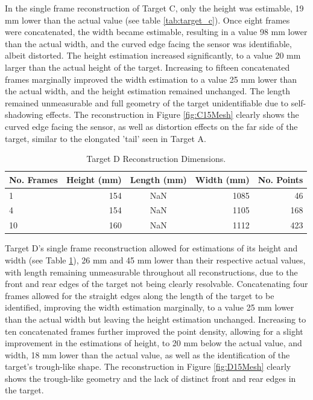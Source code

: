 In the single frame reconstruction of Target C, only the height was estimable, 19 mm lower than the actual value (see table \ref{tab:target_c}). Once eight frames were concatenated, the width became estimable, resulting in a value 98 mm lower than the actual width, and the curved edge facing the sensor was identifiable, albeit distorted. The height estimation increased significantly, to a value 20 mm larger than the actual height of the target. Increasing to fifteen concatenated frames marginally improved the width estimation to a value 25 mm lower than the actual width, and the height estimation remained unchanged. The length remained unmeasurable and full geometry of the target unidentifiable due to self-shadowing effects. The reconstruction in Figure \ref{fig:C15Mesh} clearly shows the curved edge facing the sensor, as well as distortion effects on the far side of the target, similar to the elongated 'tail' seen in Target A.

\begin{table}[H]
\centering
\caption{Target D Reconstruction Dimensions.}
\begin{tabular}{|l|r|c|r|r|}
\hline
\multicolumn{1}{|c|}{\textbf{No. Frames}} &
  \multicolumn{1}{c|}{\textbf{Height (mm)}} &
  \multicolumn{1}{r|}{\textbf{Length (mm)}} &
  \multicolumn{1}{c|}{\textbf{Width (mm)}} &
  \multicolumn{1}{l|}{\textbf{No. Points}} \\ \hline
1  & 154 & NaN & 1085 & 46  \\ \hline
4  & 154 & NaN & 1105 & 168 \\ \hline
10 & 160 & NaN & 1112 & 423 \\ \hline
\end{tabular}
\label{tab:target_d}
\end{table}

Target D's single frame reconstruction allowed for estimations of its height and width (see Table \ref{tab:target_d}), 26 mm and 45 mm lower than their respective actual values, with length remaining unmeasurable throughout all reconstructions, due to the front and rear edges of the target not being clearly resolvable. Concatenating four frames allowed for the straight edges along the length of the target to be identified, improving the width estimation marginally, to a value 25 mm lower than the actual width but leaving the height estimation unchanged. Increasing to ten concatenated frames further improved the point density, allowing for a slight improvement in the estimations of height, to 20 mm below the actual value, and width, 18 mm lower than the actual value, as well as the identification of the target's trough-like shape. The reconstruction in Figure \ref{fig:D15Mesh} clearly shows the trough-like geometry and the lack of distinct front and rear edges in the target.

